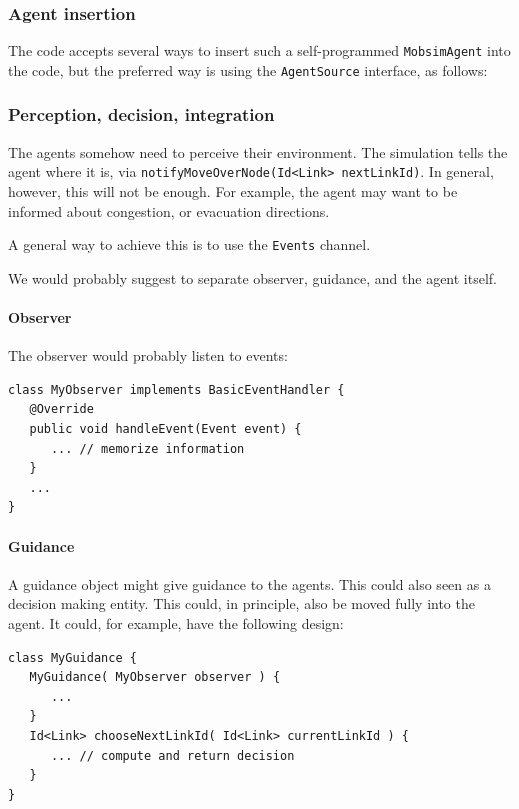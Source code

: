 \subsubsection{Agent insertion}

The code accepts several ways to insert such a self-programmed \verb$MobsimAgent$ into the code, but the preferred way is using the \verb$AgentSource$ interface, as follows:


\subsubsection{Perception, decision, integration}

The agents somehow need to perceive their environment.  The simulation tells the agent where it is, via \verb$notifyMoveOverNode(Id<Link> nextLinkId)$.  In general, however, this will not be enough.  For example, the agent may want to be informed about congestion, or evacuation directions.

A general way to achieve this is to use the \verb$Events$ channel.

We would probably suggest to separate observer, guidance, and the agent itself.

\paragraph{Observer}

The observer would probably listen to events:
\begin{lstlisting}
class MyObserver implements BasicEventHandler {
   @Override
   public void handleEvent(Event event) {
      ... // memorize information
   }
   ...
}
\end{lstlisting}

\paragraph{Guidance}

A guidance object might give guidance to the agents.  This could also seen as a decision making entity.  This could, in principle, also be moved fully into the agent.  It could, for example, have the following design:
\begin{lstlisting}
class MyGuidance {
   MyGuidance( MyObserver observer ) {
      ...
   }
   Id<Link> chooseNextLinkId( Id<Link> currentLinkId ) {
      ... // compute and return decision
   }
}
\end{lstlisting}

